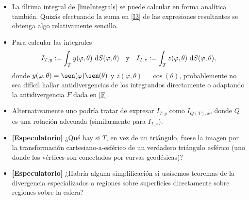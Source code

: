 \documentclass[reqno]{amsart}
\newcommand{\dd}[1][y]{\if#1y\,\fi{\mathrm d}} %
\begin{document}
\begin{itemize}[leftmargin=*]
\item La última integral de \eqref{lineIntegrals} se puede calcular en forma analítica también.
Quizás efectuando la suma en \eqref{I3} de las expresiones resultantes se obtenga algo relativamente sencillo.
\item Para calcular las integrales
%
\begin{equation*}
I_{T,y} := \int_T y(\varphi, \theta) \, \dd S(\varphi, \theta)
\quad\text{y}\quad
I_{T,z} := \int_T z(\varphi, \theta) \, \dd S(\varphi, \theta),
\end{equation*}
%
donde $y(\varphi, \theta) = \sen(\varphi) \sen(\theta)$ y $z(\varphi, \theta) = \cos(\theta)$, probablemente no sea difícil hallar antidivergencias de los integrandos directamente o adaptando la antidivergencia $F$ dada en \eqref{F}.
\item Alternativamente uno podría tratar de expresar $I_{T,y}$ como $I_{Q(T),x}$, donde $Q$ es una rotación adecuada (similarmente para $I_{T,z}$).
\item \textbf{[Especulatorio]} ¿Qué hay si $T$, en vez de un triángulo, fuese la imagen por la transformación cartesiano-a-esférico de un verdadero triángulo esférico (uno donde los vértices son conectados por curvas geodésicas)?
\item \textbf{[Especulatorio]} ¿Habría alguna simplificación si usásemos teoremas de la divergencia especializados a regiones sobre superficies directamente sobre regiones sobre la esfera?
\end{itemize}
\end{document}

